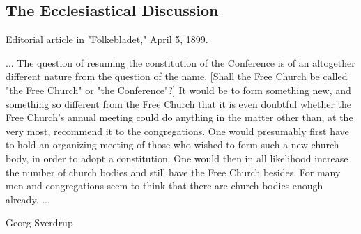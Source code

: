 
\subsection{The Ecclesiastical Discussion}

Editorial article in "Folkebladet," April 5, 1899.

... The question of resuming the constitution of the Conference is of an altogether different nature from the question of the name. [Shall the Free Church be called "the Free Church" or "the Conference"?] It would be to form something new, and something so different from the Free Church that it is even doubtful whether the Free Church’s annual meeting could do anything in the matter other than, at the very most, recommend it to the congregations. One would presumably first have to hold an organizing meeting of those who wished to form such a new church body, in order to adopt a constitution. One would then in all likelihood increase the number of church bodies and still have the Free Church besides. For many men and congregations seem to think that there are church bodies enough already. ...

Georg Sverdrup
